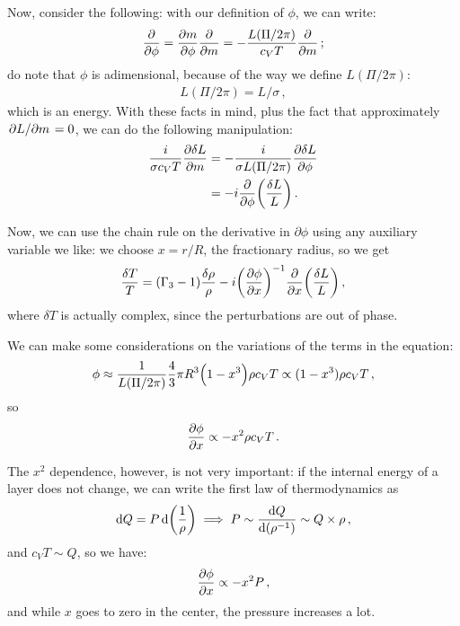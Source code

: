\documentclass[main.tex]{subfiles}
\begin{document}
Now, consider the following: with our definition of \(\phi \), we can write: 
%
\begin{align}
\pdv{}{\phi } = \pdv{m}{\phi } \pdv{}{m}
= - \frac{L(\Pi /2\pi )}{c_V T} \pdv{}{m}
\,;
\end{align}
%
do note that \(\phi \) is adimensional, because of the way we define \(L(\Pi / 2 \pi )\):
%
\begin{align}
L(\Pi / 2\pi ) = L / \sigma 
\,,
\end{align}
%
which is an energy. With these facts in mind, plus the fact that approximately \(\pdv*{L}{m} = 0\), we can do the following manipulation: 
%
\begin{subequations}
\begin{align}
\frac{i}{\sigma c_V T} \pdv{ \delta L}{m}
&= - \frac{i }{\sigma L(\Pi / 2 \pi ) } \pdv{ \delta L }{\phi }  \\
&= -i \pdv{}{\phi } \qty(\frac{ \delta L}{L})
\,.
\end{align}
\end{subequations}

Now, we can use the chain rule on the derivative in \(\partial \phi \) using any auxiliary variable we like: we choose \(x = r/ R\), the fractionary radius, so we get 
%
\begin{equation} \label{eq:temperature-evolution-transition-region}
  \frac{\delta T}{T} = (\Gamma_3 -1 ) \frac{\delta \rho }{\rho } - i \qty(\pdv{\phi }{x} )^{-1} \pdv{}{x} \qty(\frac{\delta L}{L})
\,,
\end{equation}
%
where \(\delta T\) is actually complex, since the perturbations are out of phase.

We can make some considerations on the variations of the terms in the equation: 
%
\begin{align}
\phi \approx \frac{1}{L(\Pi / 2 \pi )}
\frac{4}{3} \pi R^3 \qty(1 - x^{3}) \rho c_V T
\propto (1-x^3) \rho c_V T
\,,
\end{align}
%
so 
%
\begin{align}
\pdv{\phi }{x} \propto - x^2 \rho c_V T
\,.
\end{align}

The \(x^2\) dependence, however, is not very important: if the internal energy of a layer does not change, we can write the first law of thermodynamics as 
%
\begin{align}
\dd{Q} = P \dd{\qty(\frac{1}{\rho })} 
\implies 
P \sim \dv{Q}{ \qty(\rho^{-1})} \sim Q \times \rho 
\,,
\end{align}
%
and \(c_V T \sim Q\), so we have: 
%
\begin{align}
\pdv{\phi }{x} \propto - x^2 P
\,,
\end{align}
%
and while \(x\) goes to zero in the center, the pressure increases a lot. 
\end{document}
